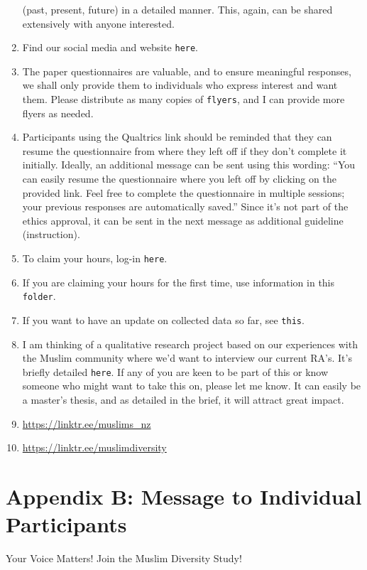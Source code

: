 \documentclass[
]{interact}
\begin{document}
\begin{enumerate}
  (past, present, future) in a detailed manner. This, again, can be
  shared extensively with anyone interested.
\item
  Find our social media and website \texttt{here}.
\item
  The paper questionnaires are valuable, and to ensure meaningful
  responses, we shall only provide them to individuals who express
  interest and want them. Please distribute as many copies of
  \texttt{flyers}, and I can provide more flyers as needed.
\item
  Participants using the Qualtrics link should be reminded that they can
  resume the questionnaire from where they left off if they don't
  complete it initially. Ideally, an additional message can be sent
  using this wording: ``You can easily resume the questionnaire where
  you left off by clicking on the provided link. Feel free to complete
  the questionnaire in multiple sessions; your previous responses are
  automatically saved.'' Since it's not part of the ethics approval, it
  can be sent in the next message as additional guideline (instruction).
\item
  To claim your hours, log-in \texttt{here}.
\item
  If you are claiming your hours for the first time, use information in
  this \texttt{folder}.
\item
  If you want to have an update on collected data so far, see
  \texttt{this}.
\item
  I am thinking of a qualitative research project based on our
  experiences with the Muslim community where we'd want to interview our
  current RA's. It's briefly detailed \texttt{here}. If any of you are
  keen to be part of this or know someone who might want to take this
  on, please let me know. It can easily be a master's thesis, and as
  detailed in the brief, it will attract great impact.
\item
  \url{https://linktr.ee/muslims_nz}
\item
  \url{https://linktr.ee/muslimdiversity}
\end{enumerate}

\newpage{}

\section{Appendix B: Message to Individual
Participants}\label{appendix-b-message-to-individual-participants}

Your Voice Matters! Join the Muslim Diversity Study!
\end{document}
